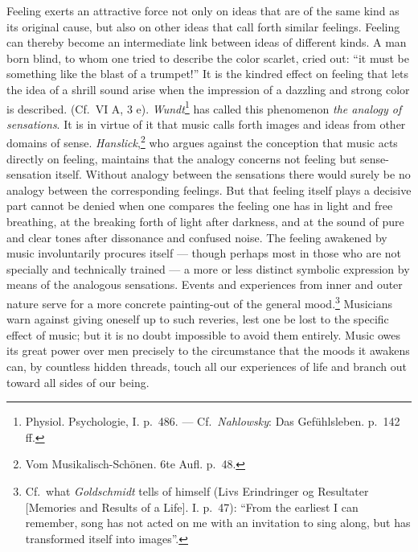 \documentclass[12pt,a4paper]{book}
\newcommand{\opage}[1]{\marginnote{\footnotesize\textit{[#1]}}}
\begin{document}
Feeling exerts an attractive force not only on ideas that are of the
same kind as its original cause, but also on other ideas that call
forth similar feelings. Feeling can thereby become an intermediate link
between ideas of different kinds. A man born blind, to whom one tried to
describe the color scarlet, cried out: ``it must be something like the
blast of a trumpet!'' It is the kindred effect on feeling that lets the
idea of a shrill sound arise when the impression of a dazzling and
strong color is described. (Cf.\ VI A, 3 e).
\emph{Wundt}\footnote{Physiol. Psychologie, I. p.~486. --- Cf.\
\emph{Nahlowsky}: Das Gefühlsleben. p.~142 ff.} has called this
phenomenon \emph{the analogy of sensations}. It is in virtue of it that
music
\opage{362}calls forth images and ideas from other domains of
sense. \emph{Hanslick},\footnote{Vom Musikalisch-Schönen. 6te Aufl.
p.~48.} who argues against the conception that music acts directly on
feeling, maintains that the analogy concerns not feeling but
sense-sensation itself. Without analogy between the sensations there
would surely be no analogy between the corresponding feelings. But that
feeling itself plays a decisive part cannot be denied when one compares
the feeling one has in light and free breathing, at the breaking forth
of light after darkness, and at the sound of pure and clear tones after
dissonance and confused noise. The feeling awakened by music
involuntarily procures itself --- though perhaps most in those who are
not specially and technically trained --- a more or less distinct
symbolic expression by means of the analogous sensations. Events and
experiences from inner and outer nature serve for a more concrete
painting-out of the general
mood.\footnote{Cf.\ what \emph{Goldschmidt} tells of himself (Livs
Erindringer og Resultater [Memories and Results of a Life]. I. p.~47):
``From the earliest I can remember, song has not acted on me with an
invitation to sing along, but has transformed itself into images''.}
Musicians warn against giving oneself up to such reveries, lest one be
lost to the specific effect of music; but it is no doubt impossible to
avoid them entirely. Music owes its great power over men precisely to
the circumstance that the moods it awakens can, by countless hidden
threads, touch all our experiences of life and branch out toward all
sides of our being.
\end{document}
